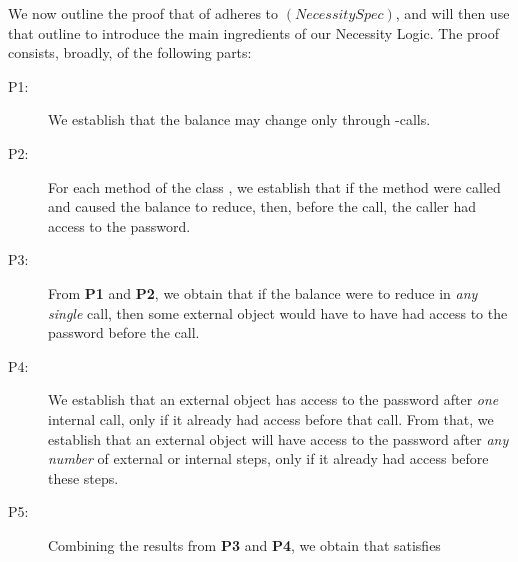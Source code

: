 
We  now outline the proof that of  adheres to $(NecessitySpec)$,
and  will then use that outline to 
 introduce the main ingredients of our Necessity Logic. The proof consists,
broadly, of the following parts:

\begin{description}
\item[P1:] We establish that the balance 
 may change only   through -\internalC calls.  

\item[P2:] 
For each method of the class  ,  we establish that   
if the method were called and  caused the  balance to reduce, then, before the call,
the caller had access  to the password.

\item[P3:]  
From \textbf{P1} and \textbf{P2}, we obtain that if the balance were to 
reduce in \emph{any}  \emph{single} call, then some
external object would have to have had access to the password before the call.

\item[P4:] We establish %
that   an external object has access to 
the password after \emph{one} internal call, only if it already had access before that call.
From that, we establish  that  an external object will have access to 
the password after \emph{any number} of external or internal 
steps, only if it already had access before these steps.

\item[P5:] Combining  the results from \textbf{P3} and \textbf{P4}, we obtain
that   satisfies 

\end{description} 
 
